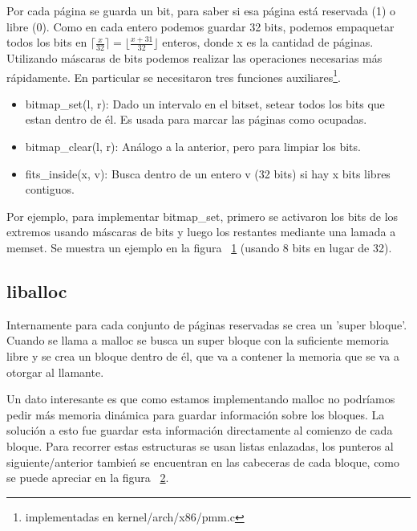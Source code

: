 Por cada página se guarda un bit, para saber si esa página está reservada (1) o libre (0). Como en cada entero podemos guardar 32 bits, podemos empaquetar todos los bits en $\lceil\frac{x}{32}\rceil=\lfloor\frac{x+31}{32}\rfloor$ enteros, donde x es la cantidad de páginas. Utilizando máscaras de bits podemos realizar las operaciones necesarias más rápidamente. En particular se necesitaron tres funciones auxiliares\footnote{implementadas en kernel/arch/x86/pmm.c}.

\begin{itemize}
\item bitmap\_set(l, r): Dado un intervalo en el bitset, setear todos los bits que estan dentro de él. Es usada para marcar las páginas como ocupadas.
\item bitmap\_clear(l, r): Análogo a la anterior, pero para limpiar los bits.
\item fits\_inside(x, v): Busca dentro de un entero v (32 bits) si hay x bits libres contiguos. 
\end{itemize}
Por ejemplo, para implementar bitmap\_set, primero se activaron los bits de los extremos usando máscaras de bits y luego los restantes mediante una lamada a memset. Se muestra un ejemplo en la figura ~\ref{fig:bitmap} (usando 8 bits en lugar de 32).

\begin{figure}[H]\caption{\label{fig:bitmap}}
\centering\def\svgwidth{\columnwidth}

\end{figure}
\subsection{liballoc}
Internamente para cada conjunto de páginas reservadas se crea un 'super bloque'. Cuando se llama a malloc se busca un super bloque con la suficiente memoria libre y se crea un bloque dentro de él, que va a contener la memoria que se va a otorgar al llamante.

Un dato interesante es que como estamos implementando malloc no podríamos pedir más memoria dinámica para guardar información sobre los bloques. La solución a esto fue guardar esta información directamente al comienzo de cada bloque. 
Para recorrer estas estructuras se usan listas enlazadas, los punteros al siguiente/anterior tambień se encuentran en las cabeceras de cada bloque, como se puede apreciar en la figura ~\ref{fig:liballoc}.

\begin{figure}[H]\caption{\label{fig:liballoc}}
\centering\def\svgwidth{\columnwidth}
\small
\end{figure}

